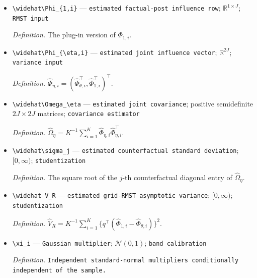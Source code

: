 \documentclass{article}
\begin{document}
\begin{itemize}
  \par\smallskip\noindent\emph{Definition.} The plug-in version of \(\Phi_{\theta,i}\) using fold-specific nuisances and estimated spectral blocks.
  \item \texttt{\textbackslash{}\allowbreak{}widehat\textbackslash{}\allowbreak{}Phi\_\allowbreak{}\{1,\allowbreak{}i\}\allowbreak{}} --- \texttt{estimated factual-\allowbreak{}post influence row}; \(\mathbb R^{1\times J}\); \texttt{RMST input}
  \par\smallskip\noindent\emph{Definition.} The plug-in version of \(\Phi_{1,i}\).
  \item \texttt{\textbackslash{}\allowbreak{}widehat\textbackslash{}\allowbreak{}Phi\_\allowbreak{}\{\textbackslash{}\allowbreak{}eta,\allowbreak{}i\}\allowbreak{}} --- \texttt{estimated joint influence vector}; \(\mathbb R^{2J}\); \texttt{variance input}
  \par\smallskip\noindent\emph{Definition.} \(\widehat\Phi_{\eta,i}=(\widehat\Phi_{\theta,i}^{\top},\widehat\Phi_{1,i}^{\top})^{\top}\).
  \item \texttt{\textbackslash{}\allowbreak{}widehat\textbackslash{}\allowbreak{}Omega\_\allowbreak{}\textbackslash{}\allowbreak{}eta} --- \texttt{estimated joint covariance}; positive semidefinite \(2J\times2J\) matrices; \texttt{covariance estimator}
  \par\smallskip\noindent\emph{Definition.} \(\widehat\Omega_\eta=K^{-1}\sum_{i=1}^K\widehat\Phi_{\eta,i}\widehat\Phi_{\eta,i}^\top\).
  \item \texttt{\textbackslash{}\allowbreak{}widehat\textbackslash{}\allowbreak{}sigma\_\allowbreak{}j} --- \texttt{estimated counterfactual standard deviation}; \([0,\infty)\); \texttt{studentization}
  \par\smallskip\noindent\emph{Definition.} The square root of the \(j\)-th counterfactual diagonal entry of \(\widehat\Omega_\eta\).
  \item \texttt{\textbackslash{}\allowbreak{}widehat V\_\allowbreak{}R} --- \texttt{estimated grid-\allowbreak{}RMST asymptotic variance}; \([0,\infty)\); \texttt{studentization}
  \par\smallskip\noindent\emph{Definition.} \(\widehat V_R=K^{-1}\sum_{i=1}^K\{q^\top(\widehat\Phi_{1,i}-\widehat\Phi_{\theta,i})\}^2\).
  \item \texttt{\textbackslash{}\allowbreak{}xi\_\allowbreak{}i} --- \texttt{Gaussian multiplier}; \(\mathcal N(0,1)\); \texttt{band calibration}
  \par\smallskip\noindent\emph{Definition.} \texttt{Independent standard-\allowbreak{}normal multipliers conditionally independent of the sample.}

\end{itemize}
\end{document}
